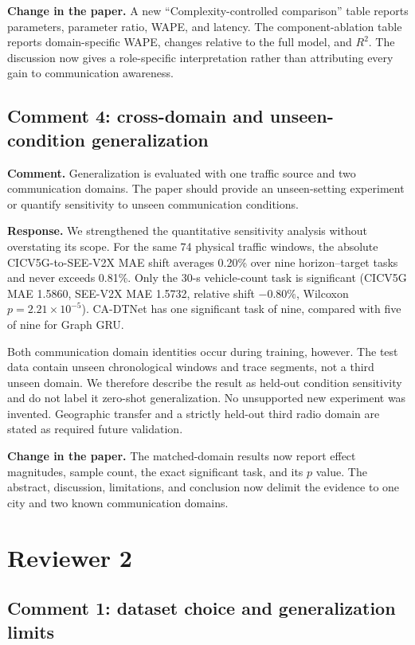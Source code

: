 \documentclass[11pt]{article}
\newcommand{\reviewcomment}[1]{\par\textcolor{commentblue}{\textbf{Comment.} #1}\par}
\newcommand{\authorresponse}[1]{\par\textcolor{responsegreen}{\textbf{Response.} #1}\par}
\newcommand{\paperchange}[1]{\par\textbf{Change in the paper.} #1\par}
\begin{document}
\paperchange{A new ``Complexity-controlled comparison'' table reports parameters, parameter ratio, WAPE, and latency. The component-ablation table reports domain-specific WAPE, changes relative to the full model, and $R^2$. The discussion now gives a role-specific interpretation rather than attributing every gain to communication awareness.}

\subsection*{Comment 4: cross-domain and unseen-condition generalization}

\reviewcomment{Generalization is evaluated with one traffic source and two communication domains. The paper should provide an unseen-setting experiment or quantify sensitivity to unseen communication conditions.}

\authorresponse{We strengthened the quantitative sensitivity analysis without overstating its scope. For the same 74 physical traffic windows, the absolute CICV5G-to-SEE-V2X MAE shift averages 0.20\% over nine horizon--target tasks and never exceeds 0.81\%. Only the 30-s vehicle-count task is significant (CICV5G MAE 1.5860, SEE-V2X MAE 1.5732, relative shift $-0.80$\%, Wilcoxon $p=2.21\times10^{-5}$). CA-DTNet has one significant task of nine, compared with five of nine for Graph GRU.}

Both communication domain identities occur during training, however. The test data contain unseen chronological windows and trace segments, not a third unseen domain. We therefore describe the result as held-out condition sensitivity and do not label it zero-shot generalization. No unsupported new experiment was invented. Geographic transfer and a strictly held-out third radio domain are stated as required future validation.

\paperchange{The matched-domain results now report effect magnitudes, sample count, the exact significant task, and its $p$ value. The abstract, discussion, limitations, and conclusion now delimit the evidence to one city and two known communication domains.}

\section*{Reviewer 2}

\subsection*{Comment 1: dataset choice and generalization limits}
\end{document}
